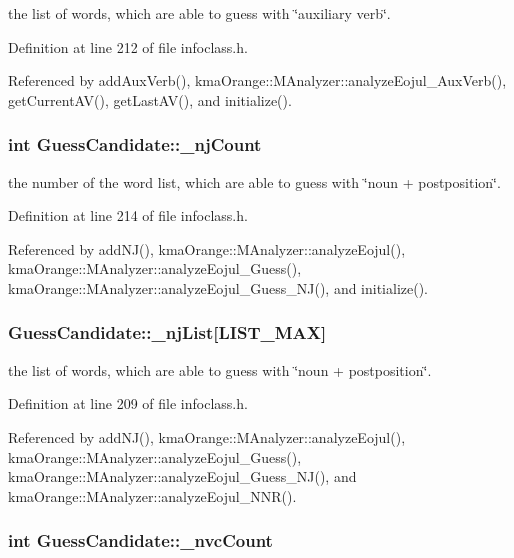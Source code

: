 the list of words, which are able to guess with \char`\"{}auxiliary verb\char`\"{}. 



Definition at line 212 of file infoclass.h.

Referenced by addAuxVerb(), kmaOrange::MAnalyzer::analyzeEojul\_\-AuxVerb(), getCurrentAV(), getLastAV(), and initialize().\hypertarget{classGuessCandidate_049a1704663dcfc0a4584c15f088500f}{
\subsubsection[{\_\-njCount}]{\setlength{\rightskip}{0pt plus 5cm}int {\bf GuessCandidate::\_\-njCount}}}
\label{classGuessCandidate_049a1704663dcfc0a4584c15f088500f}


the number of the word list, which are able to guess with \char`\"{}noun + postposition\char`\"{}. 



Definition at line 214 of file infoclass.h.

Referenced by addNJ(), kmaOrange::MAnalyzer::analyzeEojul(), kmaOrange::MAnalyzer::analyzeEojul\_\-Guess(), kmaOrange::MAnalyzer::analyzeEojul\_\-Guess\_\-NJ(), and initialize().\hypertarget{classGuessCandidate_2622d5a2c762087031cbe91489bb49cd}{
\subsubsection[{\_\-njList}]{ {\bf GuessCandidate::\_\-njList}\mbox{[}LIST\_\-MAX\mbox{]}}}
\label{classGuessCandidate_2622d5a2c762087031cbe91489bb49cd}


the list of words, which are able to guess with \char`\"{}noun + postposition\char`\"{}. 



Definition at line 209 of file infoclass.h.

Referenced by addNJ(), kmaOrange::MAnalyzer::analyzeEojul(), kmaOrange::MAnalyzer::analyzeEojul\_\-Guess(), kmaOrange::MAnalyzer::analyzeEojul\_\-Guess\_\-NJ(), and kmaOrange::MAnalyzer::analyzeEojul\_\-NNR().\hypertarget{classGuessCandidate_ab107dd9132f2ffd4293bef3f504eee5}{
\subsubsection[{\_\-nvcCount}]{\setlength{\rightskip}{0pt plus 5cm}int {\bf GuessCandidate::\_\-nvcCount}}}
\label{classGuessCandidate_ab107dd9132f2ffd4293bef3f504eee5}


